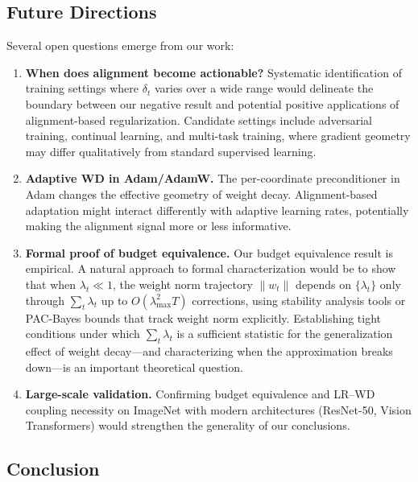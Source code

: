 \documentclass{article}
\begin{document}
\subsection{Future Directions}
\label{sec:future}

Several open questions emerge from our work:

\begin{enumerate}
  \item \textbf{When does alignment become actionable?}
        Systematic identification of training settings where $\delta_t$ varies over a
        wide range would delineate the boundary between our negative result and
        potential positive applications of alignment-based regularization.
        Candidate settings include adversarial training, continual learning, and
        multi-task training, where gradient geometry may differ qualitatively from
        standard supervised learning.

  \item \textbf{Adaptive WD in Adam/AdamW.}
        The per-coordinate preconditioner in Adam changes the effective geometry of
        weight decay.
        Alignment-based adaptation might interact differently with adaptive learning
        rates, potentially making the alignment signal more or less informative.

  \item \textbf{Formal proof of budget equivalence.}
        Our budget equivalence result is empirical.
        A natural approach to formal characterization would be to show that when
        $\lambda_t \ll 1$, the weight norm trajectory $\|w_t\|$ depends on
        $\{\lambda_t\}$ only through $\sum_t \lambda_t$ up to
        $O(\lambda_{\max}^2 T)$ corrections, using stability analysis tools
        \citep{hardt2016train} or PAC-Bayes bounds that track weight norm explicitly.
        Establishing tight conditions under which $\sum_t \lambda_t$ is a sufficient
        statistic for the generalization effect of weight decay---and characterizing
        when the approximation breaks down---is an important theoretical question.

  \item \textbf{Large-scale validation.}
        Confirming budget equivalence and LR--WD coupling necessity on ImageNet with
        modern architectures (ResNet-50, Vision Transformers) would strengthen the
        generality of our conclusions.
\end{enumerate}

\subsection{Conclusion}
\end{document}
